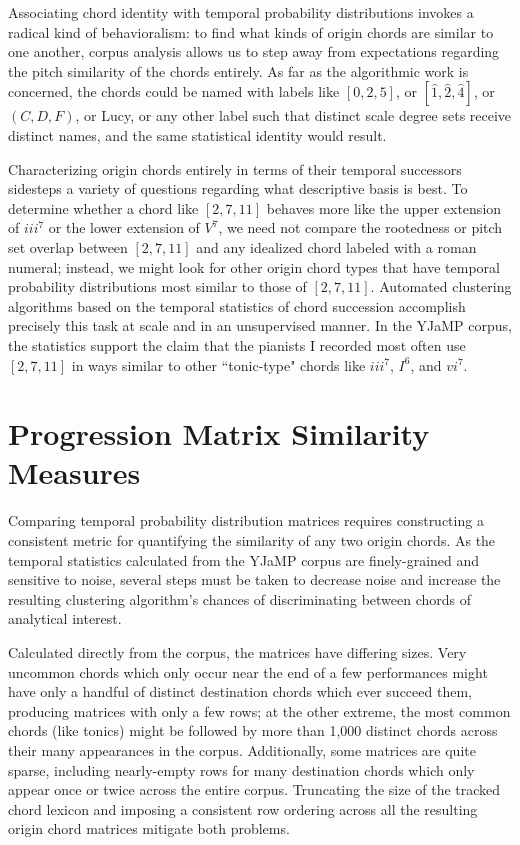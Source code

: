 
Associating chord identity with temporal probability distributions invokes a radical kind of behavioralism: to find what kinds of origin chords are similar to one another, corpus analysis allows us to step away from expectations regarding the pitch similarity of the chords entirely.  As far as the algorithmic work is concerned, the chords could be named with labels like $[0,2,5]$, or $[\hat{1},\hat{2},\hat{4}]$, or $(C,D,F)$, or Lucy, or any other label such that distinct scale degree sets receive distinct names, and the same statistical identity would result.

Characterizing origin chords entirely in terms of their temporal successors sidesteps a variety of questions regarding what descriptive basis is best.  To determine whether a chord like $[2,7,11]$ behaves more like the upper extension of $iii^7$ or the lower extension of $V^7$, we need not compare the rootedness or pitch set overlap between $[2,7,11]$ and any idealized chord labeled with a roman numeral; instead, we might look for other origin chord types that have temporal probability distributions most similar to those of $[2,7,11]$.  Automated clustering algorithms based on the temporal statistics of chord succession accomplish precisely this task at scale and in an unsupervised manner.  In the YJaMP corpus, the statistics support the claim that the pianists I recorded most often use $[2,7,11]$ in ways similar to other ``tonic-type" chords like $iii^7$, $I^6$, and $vi^7$.

\section{Progression Matrix Similarity Measures}
Comparing temporal probability distribution matrices requires constructing a consistent metric for quantifying the similarity of any two origin chords.  As the temporal statistics calculated from the YJaMP corpus are finely-grained and sensitive to noise, several steps must be taken to decrease noise and increase the resulting clustering algorithm's chances of discriminating between chords of analytical interest.

Calculated directly from the corpus, the matrices have differing sizes.  Very uncommon chords which only occur near the end of a few performances might have only a handful of distinct destination chords which ever succeed them, producing matrices with only a few rows; at the other extreme, the most common chords (like tonics) might be followed by more than 1,000 distinct chords across their many appearances in the corpus.  Additionally, some matrices are quite sparse, including nearly-empty rows for many destination chords which only appear once or twice across the entire corpus.  Truncating the size of the tracked chord lexicon and imposing a consistent row ordering across all the resulting origin chord matrices mitigate both problems.


